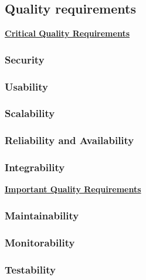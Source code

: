 \documentclass[a4paper,12pt,titlepage]{article}
\begin{document}
 	\subsection{Quality requirements}
 	
		\underline{\textbf{Critical Quality Requirements}}
		\subsubsection{Security}
			
			
		\subsubsection{Usability}
			
			
		\subsubsection{Scalability}
			
			
		\subsubsection{Reliability and Availability}
			
			
		\subsubsection{Integrability}
			
		\underline{\textbf{Important Quality Requirements}}
			
		\subsubsection{Maintainability}
			
			
		\subsubsection{Monitorability}
			
			
		\subsubsection{Testability}
			
			
\end{document}
